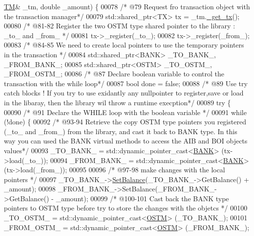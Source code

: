 \begin{DoxyCode}
      \hyperlink{class_t_m}{TM}& \_tm, \textcolor{keywordtype}{double} \_amount) \{
00078     \textcolor{comment}{/* @79 Request fro transaction object with the transaction manager*/}
00079     std::shared\_ptr<TX> tx = \_tm.\hyperlink{class_t_m_a41cb0226cc4080c931651b13f74a0075_a41cb0226cc4080c931651b13f74a0075}{\_get\_tx}();
00080     \textcolor{comment}{/* @81-82 Register the two OSTM type shared pointer to the library : \_to\_ and \_from\_ */}
00081     tx->\_register(\_to\_);
00082     tx->\_register(\_from\_);
00083     \textcolor{comment}{/*  @84-85 We need to create local pointers to use the temporary pointers in the transaction */}
00084     std::shared\_ptr<BANK> \_TO\_BANK\_, \_FROM\_BANK\_;
00085     std::shared\_ptr<OSTM> \_TO\_OSTM\_, \_FROM\_OSTM\_;
00086     \textcolor{comment}{/* @87 Declare boolean variable to control the transaction with the while loop*/}
00087     \textcolor{keywordtype}{bool} done = \textcolor{keyword}{false};
00088      \textcolor{comment}{/* @89 Use try catch blocks ! If you try to use exidantly any nullpointer to register,save or load in
       the libaray, then the library wil throw a runtime execption*/}
00089     \textcolor{keywordflow}{try} \{
00090         \textcolor{comment}{/* @91 Declare the WHILE loop with the boolean variable */}
00091         \textcolor{keywordflow}{while} (!done) \{
00092             \textcolor{comment}{/* @93-94 Retrieve the copy OSTM type pointers you registered (\_to\_ and \_from\_) from the
       library, and cast it back to BANK type. In this way you can used the BANK virtual methods to access the AIB and
       BOI objects values*/}
00093             \_TO\_BANK\_ = std::dynamic\_pointer\_cast<\hyperlink{class_b_a_n_k}{BANK}> (tx->load(\_to\_));
00094             \_FROM\_BANK\_ = std::dynamic\_pointer\_cast<\hyperlink{class_b_a_n_k}{BANK}> (tx->load(\_from\_));
00095             
00096             \textcolor{comment}{/* @97-98 make changes with the local pointers */}
00097             \_TO\_BANK\_->\hyperlink{class_b_a_n_k_ae3e45b407bf8ec7175662442ea24b7c0_ae3e45b407bf8ec7175662442ea24b7c0}{SetBalance}(\_TO\_BANK\_->GetBalance() + \_amount);
00098             \_FROM\_BANK\_->SetBalance(\_FROM\_BANK\_->GetBalance() - \_amount);
00099             \textcolor{comment}{/* @100-101 Cast back the BANK type pointers to OSTM type before try to store the changes with
       the objetcs */}
00100             \_TO\_OSTM\_ = std::dynamic\_pointer\_cast<\hyperlink{class_o_s_t_m}{OSTM}> (\_TO\_BANK\_);
00101             \_FROM\_OSTM\_ = std::dynamic\_pointer\_cast<\hyperlink{class_o_s_t_m}{OSTM}> (\_FROM\_BANK\_);

\end{DoxyCode}
